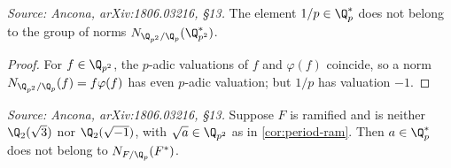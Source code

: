 \begin{lemma}
  \label{lem:not-norm-unram}
  \textit{Source: Ancona, arXiv:1806.03216, \S13.}
  The element \(1/p \in \Q_p^*\) does not belong to the group of norms
  \(N_{\Q_{p^2}/\Q_p}(\Q_{p^2}^*)\).
\end{lemma}

\begin{proof}
  For \(f \in \Q_{p^2}\), the \(p\)-adic valuations of \(f\) and \(\varphi(f)\)
  coincide, so a norm \(N_{\Q_{p^2}/\Q_p}(f) = f \varphi(f)\) has even
  \(p\)-adic valuation; but \(1/p\) has valuation \(-1\).
\end{proof}

\begin{lemma}
  \label{lem:not-norm-ram}
  \textit{Source: Ancona, arXiv:1806.03216, \S13.}
  Suppose \(F\) is ramified and is neither \(\Q_2(\sqrt 3)\) nor
  \(\Q_2(\sqrt{-1})\), with \(\sqrt{a} \in \Q_{p^2}\) as in
  \cref{cor:period-ram}. Then \(a \in \Q_p^*\) does not belong to
  \(N_{F/\Q_p}(F^*)\).
\end{lemma}

